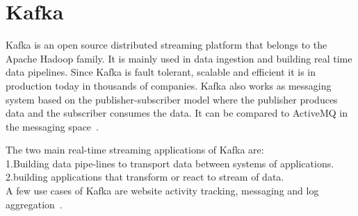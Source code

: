 \section{Kafka}

Kafka is an open source distributed streaming platform that belongs 
to the Apache Hadoop family. It is mainly used in data ingestion and 
building real time data pipelines. Since Kafka is fault tolerant, 
scalable and efficient it is in production today in thousands of 
companies. Kafka also works as messaging system based on the 
publisher-subscriber model where the publisher produces data and 
the subscriber consumes the data. It can be compared to ActiveMQ 
in the messaging space~\cite{hid-sp18-517-ApacheKafka}.


The two main real-time streaming applications of Kafka are: \\
1.Building data pipe-lines to transport data between systems of 
   applications.\\
2.building applications that transform or react to stream of data. \\

A few use cases of Kafka are website activity tracking, messaging 
and log aggregation~\cite{hid-sp18-517-ApacheKafka}.


